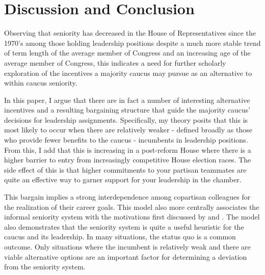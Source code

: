 \documentclass [12pt]{article}
\begin{document}
\section*{Discussion and Conclusion}

Observing that seniority has decreased in the House of Representatives since the 1970's among those holding leadership positions despite a much more stable trend of term length of the average member of Congress and an increasing age of the average member of Congress, this indicates a need for further scholarly exploration of the incentives a majority caucus may pursue as an alternative to within caucus seniority. 

In this paper, I argue that there are in fact a number of interesting alternative incentives and a resulting bargaining structure that guide the majority caucus' decisions for leadership assignments. Specifically, my theory posits that this is most likely to occur when there are relatively weaker - defined broadly as those who provide fewer benefits to the caucus - incumbents in leadership positions. From this, I add that this is increasing in a post-reform House where there is a higher barrier to entry from increasingly competitive House election races. The side effect of this is that higher commitments to your partisan teammates are quite an effective way to garner support for your leadership in the chamber.

This bargain implies a strong interdependence among copartisan colleagues for the realization of their career goals. This model also more centrally associates the informal seniority system with the motivations first discussed by  and . The model also demonstrates that the seniority system is quite a useful heuristic for the caucus and its leadership. In many situations, the status quo is a common outcome. Only situations where the incumbent is relatively weak and there are viable alternative options are an important factor for determining a deviation from the seniority system. 
\end{document}

